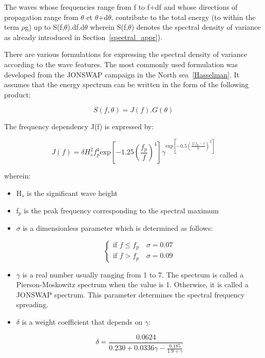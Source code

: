 The waves whose frequencies range from f to f+df and whose directions of
propagation range from $\theta$ et $\theta$+d$\theta$, contribute to the total
energy (to within the term $\rho$g) up to S(f,$\theta$).df.d$\theta$ wherein
S(f,$\theta$) denotes the spectral density of variance as already introduced in
Section~\ref{spectral_appr}).

There are various formulations for expressing the spectral density of variance
according to the wave features. The most commonly used formulation was
developed from the JONSWAP campaign in the North sea~\ref{Hasselman}. It
assumes that the energy spectrum can be written in the form of the following
product:

\begin{equation}
  S(f,\theta) = J(f).G(\theta)
  \label{3.63}
\end{equation}

The frequency dependency J(f) is expressed by:

\begin{equation}
  J(f) = \delta H^2_s f_p^4 \text{exp}\left[-1.25\left(\frac{f_p}{f}\right)^4\right] \gamma^{\text{exp}\left[-0.5\left(\frac{f/f_p -1}{\alpha}\right)^2\right]}
  \label{3.64}
\end{equation}

wherein:
\begin{itemize}
  \item H${}_{s}$ is the significant wave height

  \item f${}_{p}$ is the peak frequency corresponding to the spectral maximum

  \item $\sigma$ is a dimensionless parameter which is determined as follows:

    \[
      \left\{
      \begin{matrix}
        \text{if } f \leq f_p \quad \sigma = 0.07\\
        \text{if } f > f_p \quad \sigma = 0.09
      \end{matrix}
      \right.
      \]

  \item $\gamma$ is a real number usually ranging from 1 to 7. The spectrum is
    called a Pierson-Moskowitz spectrum when the value is 1. Otherwise, it is
    called a JONSWAP spectrum. This parameter determines the spectral frequency
    spreading.

  \item $\delta$ is a weight coefficient that depends on $\gamma$:

    \[ \delta = \frac{0.0624}{0.230+0.0336\gamma-\frac{0.185}{1.9+\gamma}} \]

\end{itemize}


